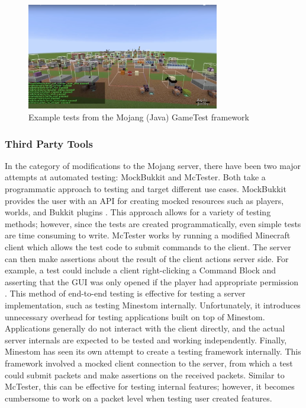 \documentclass[12pt]{article}
\begin{document}
\begin{onehalfspacing}
\begin{figure}[h] 
    \centering
    \includegraphics[width=0.75\textwidth]{media/media/image7.png} 
    \caption{Example tests from the Mojang (Java) GameTest framework}
    \label{fig:2_6_1_2} 
\end{figure}

\subsubsection{Third Party Tools}

In the category of modifications to the Mojang server, there have been
two major attempts at automated testing: MockBukkit and McTester. Both
take a programmatic approach to testing and target different use cases.
MockBukkit provides the user with an API for creating mocked resources
such as players, worlds, and Bukkit plugins \parencite{mockbukkit}. 
This approach allows for a variety of testing methods; however, since the
tests are created programmatically, even simple tests are time consuming
to write. McTester works by running a modified Minecraft client which
allows the test code to submit commands to the client. The server can
then make assertions about the result of the client actions server side.
For example, a test could include a client right-clicking a Command
Block and asserting that the GUI was only opened if the player had
appropriate permission \parencite{mctester}. 
This method of end-to-end testing is effective for testing a server implementation, such as testing
Minestom internally. Unfortunately, it introduces unnecessary overhead
for testing applications built on top of Minestom. Applications
generally do not interact with the client directly, and the actual
server internals are expected to be tested and working independently.
Finally, Minestom has seen its own attempt to create a testing framework
internally. This framework involved a mocked client connection to the
server, from which a test could submit packets and make assertions on
the received packets. Similar to McTester, this can be effective for
testing internal features; however, it becomes cumbersome to work on a
packet level when testing user created features.


\end{onehalfspacing}
\end{document}
